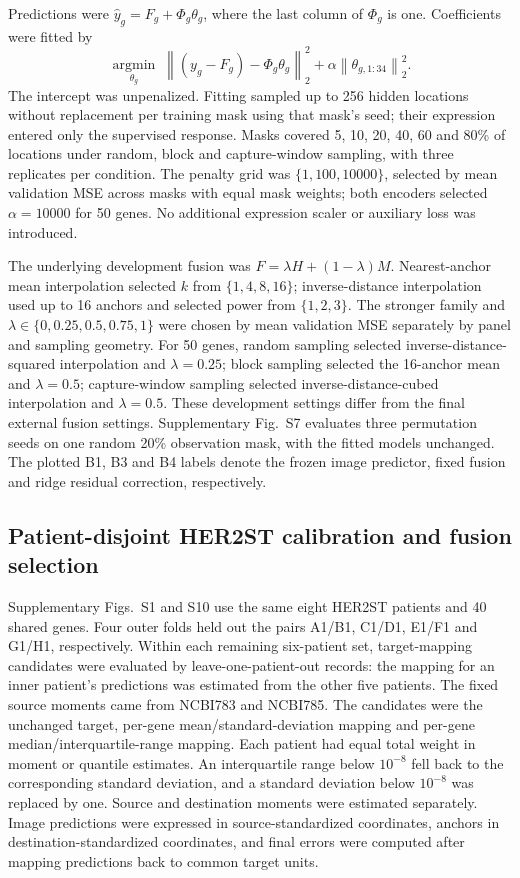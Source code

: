 Predictions were $\widehat y_g=F_g+\Phi_g\theta_g$, where the last column of $\Phi_g$ is one. Coefficients were fitted by
\[
 \underset{\theta_g}{\operatorname{argmin}}\;
 \left\|(y_g-F_g)-\Phi_g\theta_g\right\|_2^2
 +\alpha\left\|\theta_{g,1:34}\right\|_2^2.
\]
The intercept was unpenalized. Fitting sampled up to 256 hidden locations without replacement per training mask using that mask's seed; their expression entered only the supervised response. Masks covered 5, 10, 20, 40, 60 and 80\% of locations under random, block and capture-window sampling, with three replicates per condition. The penalty grid was $\{1,100,10000\}$, selected by mean validation MSE across masks with equal mask weights; both encoders selected $\alpha=10000$ for 50 genes. No additional expression scaler or auxiliary loss was introduced.

The underlying development fusion was $F=\lambda H+(1-\lambda)M$. Nearest-anchor mean interpolation selected $k$ from $\{1,4,8,16\}$; inverse-distance interpolation used up to 16 anchors and selected power from $\{1,2,3\}$. The stronger family and $\lambda\in\{0,0.25,0.5,0.75,1\}$ were chosen by mean validation MSE separately by panel and sampling geometry. For 50 genes, random sampling selected inverse-distance-squared interpolation and $\lambda=0.25$; block sampling selected the 16-anchor mean and $\lambda=0.5$; capture-window sampling selected inverse-distance-cubed interpolation and $\lambda=0.5$. These development settings differ from the final external fusion settings. Supplementary Fig.~S7 evaluates three permutation seeds on one random 20\% observation mask, with the fitted models unchanged. The plotted B1, B3 and B4 labels denote the frozen image predictor, fixed fusion and ridge residual correction, respectively.

\subsection{Patient-disjoint HER2ST calibration and fusion selection}
Supplementary Figs.~S1 and S10 use the same eight HER2ST patients and 40 shared genes. Four outer folds held out the pairs A1/B1, C1/D1, E1/F1 and G1/H1, respectively. Within each remaining six-patient set, target-mapping candidates were evaluated by leave-one-patient-out records: the mapping for an inner patient's predictions was estimated from the other five patients. The fixed source moments came from NCBI783 and NCBI785. The candidates were the unchanged target, per-gene mean/standard-deviation mapping and per-gene median/interquartile-range mapping. Each patient had equal total weight in moment or quantile estimates. An interquartile range below $10^{-8}$ fell back to the corresponding standard deviation, and a standard deviation below $10^{-8}$ was replaced by one. Source and destination moments were estimated separately. Image predictions were expressed in source-standardized coordinates, anchors in destination-standardized coordinates, and final errors were computed after mapping predictions back to common target units.


